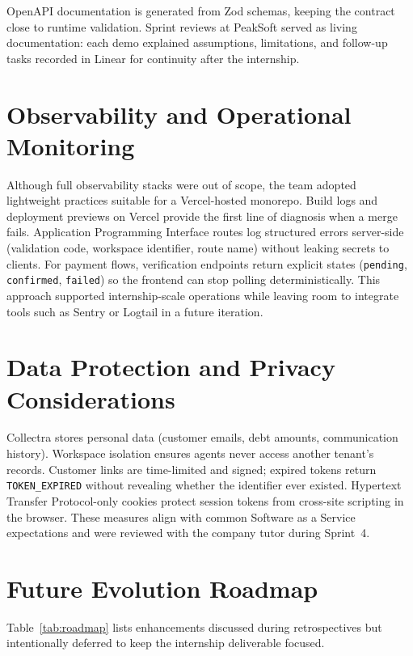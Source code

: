 ﻿\documentclass[12pt,a4paper]{report}
\begin{document}
OpenAPI documentation is generated from Zod schemas, keeping the contract close to runtime
validation.
Sprint reviews at PeakSoft served as living documentation: each demo explained assumptions,
limitations, and follow-up tasks recorded in Linear for continuity after the internship.

\section{Observability and Operational Monitoring}

Although full observability stacks were out of scope, the team adopted lightweight practices
suitable for a Vercel-hosted monorepo.
Build logs and deployment previews on Vercel provide the first line of diagnosis when a merge
fails.
Application Programming Interface routes log structured errors server-side (validation code,
workspace identifier, route name) without leaking secrets to clients.
For payment flows, verification endpoints return explicit states (\texttt{pending},
\texttt{confirmed}, \texttt{failed}) so the frontend can stop polling deterministically.
This approach supported internship-scale operations while leaving room to integrate tools such as
Sentry or Logtail in a future iteration.

\section{Data Protection and Privacy Considerations}

Collectra stores personal data (customer emails, debt amounts, communication history).
Workspace isolation ensures agents never access another tenant's records.
Customer links are time-limited and signed; expired tokens return \texttt{TOKEN\_EXPIRED} without
revealing whether the identifier ever existed.
Hypertext Transfer Protocol-only cookies protect session tokens from cross-site scripting in the
browser.
These measures align with common Software as a Service expectations and were reviewed with the
company tutor during Sprint~4.

\section{Future Evolution Roadmap}

Table~\ref{tab:roadmap} lists enhancements discussed during retrospectives but intentionally
deferred to keep the internship deliverable focused.
\end{document}
